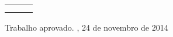 %
%

\begin{folhadeaprovacao}

	\begin{center}
		{\large\normalfont\scshape\textbf\imprimirautor}

		\vspace*{\fill}\vspace*{\fill}
		\begin{center}
			\ABNTEXchapterfont\Large\scshape\imprimirtitulo
		\end{center}
		\vspace*{\fill}

		\SingleSpacing
		\begin{tabular}{p{}p{}p{}}
			& \multicolumn{2}{p{.6\textwidth}}{\small\hyphenpenalty=10000{\imprimirpreambulo}} \\ & & \\
		\end{tabular}
		\vspace*{\fill}

		Trabalho aprovado. \imprimirlocal, 24 de novembro de 2014
	\end{center}


	\begin{center}
		\normalfont\scshape{\imprimirinstituicao}\\
		\normalfont\scshape{\imprimirprograma}\\
		\normalfont\scshape\normalsize{\imprimirlocal}\\
		\normalfont\scshape\normalsize{\imprimirdata}
	\end{center}

\end{folhadeaprovacao}
